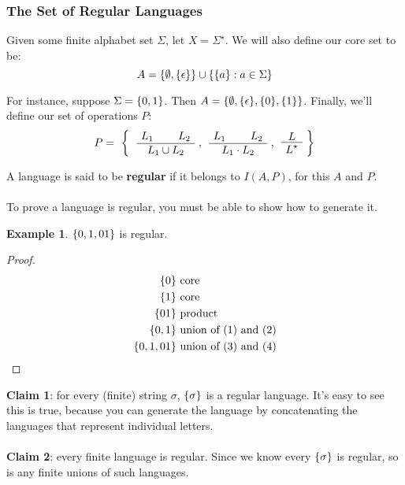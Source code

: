 \documentclass[]{article}
\DeclarePairedDelimiter{\set}{\lbrace}{\rbrace}
\theoremstyle{definition}
\newtheorem{ex}{Example}[section]
\begin{document}
        \subsubsection{The Set of Regular Languages}
          Given some finite alphabet set $\Sigma$, let $X = \Sigma^\star$. We will also define our core set to be:
          $$
            A = \set{\emptyset, \set{\epsilon}} \cup \set{ \set{a} : a \in \Sigma }
          $$

          For instance, suppose $\Sigma = \set{0, 1}$. Then $A = \set{ \emptyset, \set{ \epsilon }, \set{ 0 }, \set{ 1 } }$. Finally, we'll define our set of operations $P$:
          $$
            P = \text{ \bigg\{ \AxiomC{$L_1$} \AxiomC{$L_2$} \BinaryInfC{$L_1 \cup L_2$} \DisplayProof, \AxiomC{$L_1$} \AxiomC{$L_2$} \BinaryInfC{$L_1 \cdot L_2$} \DisplayProof, \AxiomC{$L$} \UnaryInfC{$L^\star$} \DisplayProof \bigg\}}
          $$

          A language is said to be \textbf{regular} if it belongs to $I(A, P)$, for this $A$ and $P$.
          \\ \\
          To prove a language is regular, you must be able to show how to generate it.

          \begin{ex}
            $\set{0, 1, 01}$ is regular.
            \begin{proof}
              \begin{align}
                \set{0} &\text{ core} \\
                \set{1} &\text{ core} \\
                \set{01} &\text{ product} \\
                \set{0, 1} &\text{ union of (1) and (2)} \\
                \set{0, 1, 01} &\text{ union of (3) and (4)}
              \end{align}
              \setcounter{equation}{0}
            \end{proof}
          \end{ex}

          \textbf{Claim 1}: for every (finite) string $\sigma$, $\set{\sigma}$ is a regular language. It's easy to see this is true, because you can generate the language by concatenating the languages that represent individual letters.
          \\ \\
          \textbf{Claim 2}: every finite language is regular. Since we know every $\set{\sigma}$ is regular, so is any finite unions of such languages.
\end{document}

